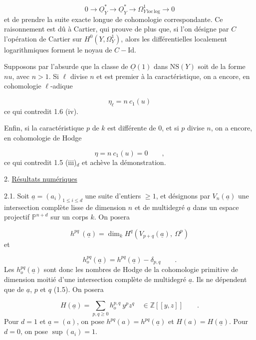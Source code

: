 \begin{equation*}
0 \longrightarrow \underline{O}^*_Y \longrightarrow \underline{O}^*_Y \longrightarrow \Omega^1_{Y\,\mathrm{loc}\,\mathrm{log}} \longrightarrow 0
\end{equation*}
et de prendre la suite exacte longue de cohomologie correspondante. Ce raisonnement est dû à Cartier, qui prouve de plus que, si l'on désigne par $C$ l'opération de Cartier sur $H^0(Y,\Omega^1_Y)$, alors les différentielles localement logarithmiques forment le noyau de $C - \mathrm{Id}$.

Supposons par l'absurde que la classe de $\underline{O}(1)$ dans $\mathrm{NS}(Y)$ soit de la forme $nu$, avec $n > 1$. Si $\ell$ divise $n$ et est premier à la caractéristique,
on a encore, en cohomologie $\ell$-adique

\begin{equation*}
\eta_\ell = n\ c_1(u)
\end{equation*}
ce qui contredit 1.6 (iv).

Enfin, si la caractéristique $p$ de $k$ est différente de $0$, et si $p$ divise $n$, on a encore, en cohomologie de Hodge

\begin{equation*}
\eta = n\ c_1(u) = 0 \qquad ,
\end{equation*}
ce qui contredit 1.5 (iii)$_d$ et achève la démonstration.


2. \underline{Résultats numériques}

2.1. Soit $\underline{a}=(a_i)_{1\leq i\leq d}$ une suite d'entiers $\geq 1$, et désignons par $V_n(\underline{a})$ une intersection complète lisse de dimension $n$ et de multidegré $\underline{a}$ dans un espace projectif $\mathbb{P}^{n+d}$ sur un corps $k$. On posera

\begin{equation*}
h^{pq}\ (\underline{a}) = \dim_k H^q(V_{p+q}(\underline{a}),\ \Omega^p)
\end{equation*}
et

\begin{equation*}
h_o^{pq}(\underline{a}) = h^{pq}(\underline{a}) - \delta_{p,q} \qquad .
\end{equation*}
Les $h_o^{pq}(\underline{a})$ sont donc les nombres de Hodge de la cohomologie primitive de dimension moitié d'une intersection complète de multidegré $\underline{a}$. Ils ne dépendent que de $\underline{a}$, $p$ et $q$ (1.5). On posera

\begin{equation}\tag{2.1.1}
H(\underline{a}) = \sum_{p,q\geq 0} h_o^{p,q}\ y^p z^q \quad \in \mathbb{Z}[[y,z]] \qquad .
\end{equation}
Pour $d = 1$ et $\underline{a} = (a)$, on pose $h^{pq}(a) = h^{pq}(\underline{a})$ et $H(a) = H(\underline{a})$. Pour $d = 0$, on pose $\sup(a_i) = 1$.

